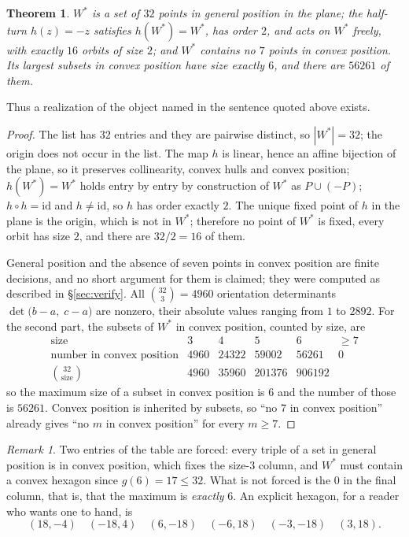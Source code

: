 \documentclass[11pt]{amsart}
\newtheorem{theorem}{Theorem}
\theoremstyle{remark}
\newtheorem*{remark}{Remark}
\begin{document}
\begin{theorem}\label{thm:main}
$W^{*}$ is a set of $32$ points in general position in the plane; the half-turn
$h(z)=-z$ satisfies $h(W^{*})=W^{*}$, has order $2$, and acts on $W^{*}$
freely, with exactly $16$ orbits of size $2$; and $W^{*}$ contains no $7$
points in convex position. Its largest subsets in convex position have size
exactly $6$, and there are $56261$ of them.
\end{theorem}

Thus a realization of the object named in the sentence quoted above exists.

\begin{proof}
The list has $32$ entries and they are pairwise distinct, so $|W^{*}|=32$; the
origin does not occur in the list. The map $h$ is linear, hence an affine
bijection of the plane, so it preserves collinearity, convex hulls and convex
position; $h(W^{*})=W^{*}$ holds entry by entry by construction of $W^{*}$ as
$P\cup(-P)$; $h\circ h=\mathrm{id}$ and $h\neq\mathrm{id}$, so $h$ has order
exactly $2$. The unique fixed point of $h$ in the plane is the origin, which is
not in $W^{*}$; therefore no point of $W^{*}$ is fixed, every orbit has size
$2$, and there are $32/2=16$ of them.

General position and the absence of seven points in convex position are finite
decisions, and no short argument for them is claimed; they were computed as
described in \S\ref{sec:verify}. All $\binom{32}{3}=4960$ orientation
determinants $\det\bigl(b-a,\;c-a\bigr)$ are nonzero, their absolute values
ranging from $1$ to $2892$. For the second part, the subsets of $W^{*}$ in
convex position, counted by size, are
\[
\begin{array}{r|ccccc}
 \text{size} & 3 & 4 & 5 & 6 & \ge 7\\\hline
 \text{number in convex position} & 4960 & 24322 & 59002 & 56261 & 0\\
 \binom{32}{\text{size}} & 4960 & 35960 & 201376 & 906192 &
\end{array}
\]
so the maximum size of a subset in convex position is $6$ and the number of
those is $56261$. Convex position is inherited by subsets, so ``no $7$ in
convex position'' already gives ``no $m$ in convex position'' for every
$m\ge 7$.
\end{proof}

\begin{remark}
Two entries of the table are forced: every triple of a set in general position
is in convex position, which fixes the size-$3$ column, and $W^{*}$ must
contain a convex hexagon since $g(6)=17\le 32$. What is not forced is the $0$
in the final column, that is, that the maximum is \emph{exactly} $6$. An
explicit hexagon, for a reader who wants one to hand, is
\[
 (18,-4)\quad(-18,4)\quad(6,-18)\quad(-6,18)\quad(-3,-18)\quad(3,18).
\]
\end{remark}
\end{document}
